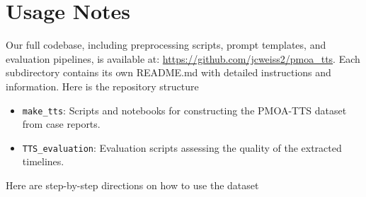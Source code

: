 \documentclass[pdflatex,sn-mathphys-num]{sn-jnl}%
\theoremstyle{thmstyleone}%
\theoremstyle{thmstyletwo}%
\theoremstyle{thmstylethree}%
\begin{document}



\section{Usage Notes}
\label{sec:usage-notes}

Our full codebase, including preprocessing scripts, prompt templates, and evaluation pipelines,
is available at: \url{https://github.com/jcweiss2/pmoa_tts}. Each subdirectory contains its own README.md with detailed instructions and information. Here is the repository structure
\begin{itemize}
    \item \texttt{make\_tts}: Scripts and notebooks for constructing the PMOA-TTS dataset from case reports.
    \item \texttt{TTS\_evaluation}: Evaluation scripts assessing the quality of the extracted timelines.
\end{itemize}

\noindent Here are step-by-step directions on how to use the dataset
\end{document}
